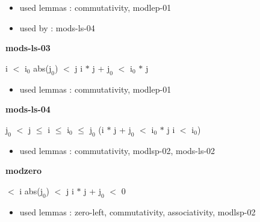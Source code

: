 \documentclass[a4paper]{article}
\begin{document}
\begin{itemize}


\item       used lemmas  : commutativity, modlep-01
\item       used by      : mods-ls-04

\end{itemize}

\medskip

\bigskip

{\large\bf mods-ls-03}

\medskip

 \Fol i $<$ $\mbox{i}_{0}$ \And abs($\mbox{j}_{0}$) $<$ j \Imp i $*$ j + $\mbox{j}_{0}$ $<$ $\mbox{i}_{0}$ $*$ j

\begin{itemize}


\item       used lemmas  : commutativity, modlep-01

\end{itemize}

\medskip

\bigskip

{\large\bf mods-ls-04}

\medskip

 \Fol $\mbox{j}_{0}$ $<$ j  $\le$ i  $\le$ $\mbox{i}_{0}$  $\le$ $\mbox{j}_{0}$ \Imp (i $*$ j + $\mbox{j}_{0}$ $<$ $\mbox{i}_{0}$ $*$ j \Equiv i $<$ $\mbox{i}_{0}$)

\begin{itemize}


\item       used lemmas  : commutativity, modlsp-02, mods-ls-02

\end{itemize}

\medskip

\bigskip

{\large\bf modzero}

\medskip

  $<$ i \And abs($\mbox{j}_{0}$) $<$ j \Imp \Not i $*$ j + $\mbox{j}_{0}$ $<$ 0

\begin{itemize}


\item       used lemmas  : zero-left, commutativity, associativity, modlsp-02

\end{itemize}

\medskip
\end{document}
